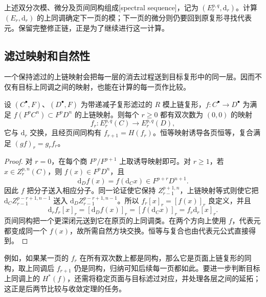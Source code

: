 上述双分次模、微分及页间同构组成[spectral sequence]，记为 \((E_r^{p,q},\mathrm d_r)\)。计算 \((E_r,\mathrm d_r)\) 的上同调确定下一页的模；下一页的微分则仍要回到原复形寻找代表元。保留完整修正链，正是为了继续进行这一计算。

\subsection{滤过映射和自然性}
\label{g2:subsec:1002:05}

一个保持滤过的上链映射会把每一层的消去过程送到目标复形中的同一层。因而不仅有目标上同调之间的映射，也能在计算的每一页作比较。

\begin{proposition}\label{g2:prop:spectral-sequence-naturality}
	设 \((C^\bullet,F)\)、\((D^\bullet,F)\) 为带递减子复形滤过的 \(R\) 模上链复形，\(f:C^\bullet\to D^\bullet\) 为满足 \(f(F^pC^n)\subset F^pD^n\) 的上链映射。则每个 \(r\ge0\) 都有双次数为 \((0,0)\) 的映射
	\[
		f_r:E_r^{p,q}(C)\longrightarrow E_r^{p,q}(D),
	\]
	它与 \(\mathrm d_r\) 交换，且经页间同构有 \(f_{r+1}=H(f_r)\)。恒等映射诱导各页恒等，复合满足 \((gf)_r=g_rf_r\)。
\end{proposition}
\begin{proof}
	对 \(r=0\)，在每个商 \(F^p/F^{p+1}\) 上取诱导映射即可。对 \(r\ge1\)，若 \(x\in Z_r^{p,n}(C)\)，则 \(f(x)\in F^pD^n\)，且
	\[
		\mathrm d_Df(x)=f(\mathrm d_Cx)\in F^{p+r}D^{n+1}.
	\]
	因此 \(f\) 把分子送入相应分子。同一论证使它保持 \(Z_{r-1}^{p+1,n}\)，上链映射等式则使它把 \(\mathrm d_CZ_{r-1}^{p-r+1,n-1}\) 送入 \(\mathrm d_DZ_{r-1}^{p-r+1,n-1}\)。所以 \(f_r[x]_r=[f(x)]_r\) 良定义，并且
	\[
		\mathrm d_rf_r[x]_r=[\mathrm d_Df(x)]_r=[f(\mathrm d_Cx)]_r=f_r\mathrm d_r[x]_r.
	\]
	页间同构把一个更深闭元送到它在原页的上同调类。在两个方向上使用 \(f\)，代表元都变成同一个 \(f(x)\)，故所需自然方块交换。恒等与复合也由代表元公式直接得到。
\end{proof}

例如，如果某一页的 \(f_r\) 在所有双次数上都是同构，那么它是页面上链复形的同构，取上同调后 \(f_{r+1}\) 仍是同构，归纳可知后续每一页都如此。要进一步判断目标上同调上的 \(H^*(f)\)，还需将稳定页面与目标滤过对应，并处理各层之间的延拓；这正是后两节比较与收敛定理的任务。
